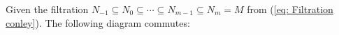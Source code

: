	\begin{theorem} \label{thm: commuting connecting homomorphism}
	Given the filtration $N_{-1}\subseteq N_0 \subseteq \cdots \subseteq N_{m-1} \subseteq N_m=M$   from (\ref{eq: Filtration conley}).  The following diagram commutes:
	\begin{center}
	\end{center}
\end{theorem}
